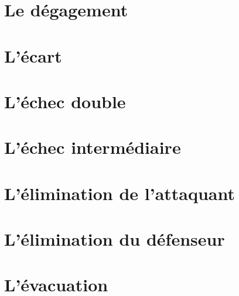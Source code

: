 \documentclass[a5paper,openany,twocolumn]{book}
\begin{document}
{\lipsum[4]

\chapter{Le dégagement}

\lipsum[4]

\chapter{L'écart}

\lipsum[4]

\chapter{L'échec double}

\lipsum[4]
\chapter{L'échec intermédiaire}

\lipsum[4]
\chapter{L'élimination de l'attaquant}

\lipsum[4]

\chapter{L'élimination du défenseur}


\lipsum[4]
\chapter{L'évacuation}

}
\end{document}
